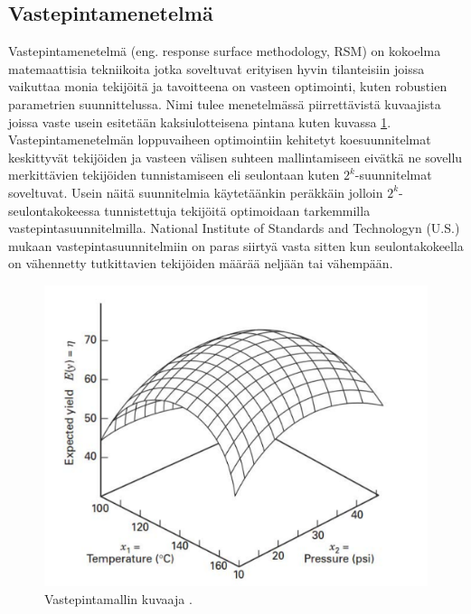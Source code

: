\documentclass[12pt,a4paper,finnish]{tutthesis}
\begin{document}
\subsection{Vastepintamenetelmä}
\label{vastep}

Vastepintamenetelmä (eng. response surface methodology, RSM)
on kokoelma matemaattisia tekniikoita jotka soveltuvat erityisen hyvin tilanteisiin
joissa vaikuttaa monia tekijöitä ja tavoitteena on vasteen optimointi, kuten
robustien parametrien suunnittelussa. Nimi tulee menetelmässä piirrettävistä
kuvaajista joissa vaste usein esitetään kaksiulotteisena pintana kuten kuvassa \ref{fig:RSM}.
Vastepintamenetelmän loppuvaiheen optimointiin kehitetyt koesuunnitelmat
keskittyvät tekijöiden ja vasteen välisen suhteen mallintamiseen
eivätkä ne sovellu merkittävien tekijöiden tunnistamiseen eli seulontaan kuten $2^k$-suunnitelmat
soveltuvat. Usein näitä suunnitelmia käytetäänkin peräkkäin jolloin
$2^k$-seulontakokeessa tunnistettuja tekijöitä optimoidaan tarkemmilla vastepintasuunnitelmilla.
National Institute of Standards and
Technologyn (U.S.) \parencite*{ehandbook} mukaan vastepintasuunnitelmiin on paras siirtyä vasta
sitten kun seulontakokeella on vähennetty tutkittavien tekijöiden määrää
neljään tai vähempään.

\begin{figure}
  \begin{center}
    \includegraphics[scale=0.6]{RSM}
  \end{center}
  \caption[Vastepintamallin kuvaaja]{Vastepintamallin kuvaaja \parencite[s.~479]{Montgomery2012}.}
  \label{fig:RSM}
\end{figure}
\end{document}
